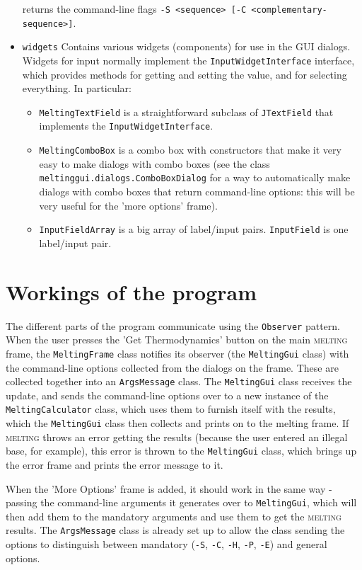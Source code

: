 \documentclass{article}
\begin{document}
\begin{itemize}
  returns the command-line flags \texttt{-S <sequence> [-C
  <complementary-sequence>]}.  
  \item \texttt{widgets} Contains various widgets (components) for use in the 
  GUI dialogs.  Widgets for input normally implement the
  \texttt{InputWidgetInterface} interface, which provides methods for getting
  and setting the value, and for selecting everything.  In particular: 
  \begin{itemize}
    \item \texttt{MeltingTextField} is a straightforward subclass of 
    \texttt{JTextField} that implements the \texttt{InputWidgetInterface}.
    \item \texttt{MeltingComboBox} is a combo box with constructors that make
    it very easy to make dialogs with combo boxes (see the class 
    \texttt{meltinggui.dialogs.ComboBoxDialog} for a way to automatically make
    dialogs with combo boxes that return command-line options: this will be 
    very useful for the 'more options' frame).
    \item \texttt{InputFieldArray} is a big array of label/input pairs.  
    \texttt{InputField} is one label/input pair.
  \end{itemize}
\end{itemize}

\section{Workings of the program}

The different parts of the program communicate using the \texttt{Observer}
pattern.  When the user presses the 'Get Thermodynamics' button on the main 
\textsc{melting} frame, the \texttt{MeltingFrame} class notifies its observer
(the \texttt{MeltingGui} class) with the command-line options collected from 
the dialogs on the frame.  These are collected together into an 
\texttt{ArgsMessage} class.  The \texttt{MeltingGui} class receives the update,
and sends the command-line options over to a new instance of the 
\texttt{MeltingCalculator} class, which uses them to furnish itself with the
results, which the \texttt{MeltingGui} class then collects and prints on to the
melting frame.  If \textsc{melting} throws an error getting the results
(because the user entered an illegal base, for example), this error is thrown
to the \texttt{MeltingGui} class, which brings up the error frame and prints
the error message to it.

When the 'More Options' frame is added, it should work in the same way -
passing the command-line arguments it generates over to \texttt{MeltingGui}, 
which will then add them to the mandatory arguments and use them to get the
\textsc{melting} results.  The \texttt{ArgsMessage} class is already set up to
allow the class sending the options to distinguish between mandatory 
(\texttt{-S}, \texttt{-C}, \texttt{-H}, \texttt{-P}, \texttt{-E}) and general
options.  
\end{document}
